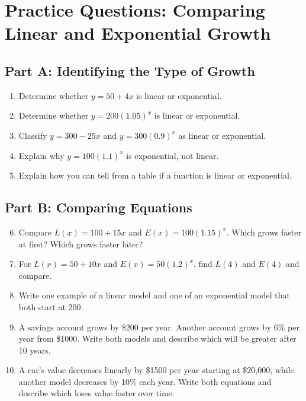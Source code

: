 \documentclass[12pt]{article}
\begin{document}
\newpage


\section*{Practice Questions: Comparing Linear and Exponential Growth}

\subsection*{Part A: Identifying the Type of Growth}
\begin{enumerate}
  \item Determine whether \(y = 50 + 4x\) is linear or exponential.
  \item Determine whether \(y = 200(1.05)^x\) is linear or exponential.
  \item Classify \(y = 300 - 25x\) and \(y = 300(0.9)^x\) as linear or exponential.
  \item Explain why \(y = 100(1.1)^x\) is exponential, not linear.
  \item Explain how you can tell from a table if a function is linear or exponential.
\end{enumerate}

\subsection*{Part B: Comparing Equations}
\begin{enumerate}
  \setcounter{enumi}{5}
  \item Compare \(L(x) = 100 + 15x\) and \(E(x) = 100(1.15)^x\).  
  Which grows faster at first? Which grows faster later?
  \item For \(L(x) = 50 + 10x\) and \(E(x) = 50(1.2)^x\), find \(L(4)\) and \(E(4)\) and compare.
  \item Write one example of a linear model and one of an exponential model that both start at 200.
  \item A savings account grows by \$200 per year. Another account grows by 6\% per year from \$1000.  
  Write both models and describe which will be greater after 10 years.
  \item A car’s value decreases linearly by \$1500 per year starting at \$20,000, while another model decreases by 10\% each year.  
  Write both equations and describe which loses value faster over time.
\end{enumerate}
\end{document}
